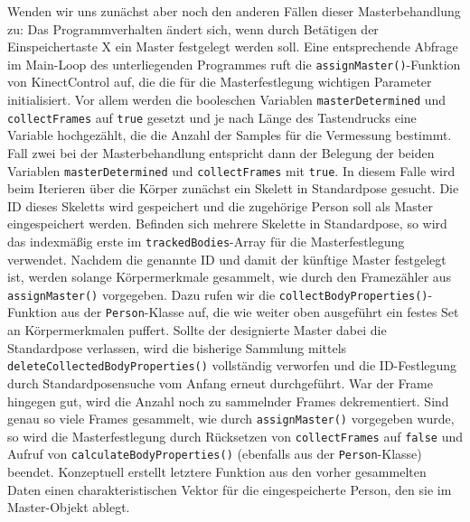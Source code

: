 Wenden wir uns zunächst aber noch den anderen Fällen dieser Masterbehandlung zu: Das Programmverhalten ändert sich, wenn durch Betätigen der Einspeichertaste X ein Master festgelegt werden soll. Eine entsprechende Abfrage im Main-Loop des unterliegenden Programmes ruft die \texttt{assignMaster()}-Funktion von KinectControl auf, die die für die Masterfestlegung wichtigen Parameter initialisiert. Vor allem werden die booleschen Variablen \texttt{masterDetermined} und \texttt{collectFrames} auf \texttt{true} gesetzt und je nach Länge des Tastendrucks eine Variable hochgezählt, die die Anzahl der Samples für die Vermessung bestimmt. Fall zwei bei der Masterbehandlung entspricht dann der Belegung der beiden Variablen \texttt{masterDetermined} und \texttt{collectFrames} mit \texttt{true}. In diesem Falle wird beim Iterieren über die Körper zunächst ein Skelett in Standardpose gesucht. Die ID dieses Skeletts wird gespeichert und die zugehörige Person soll als Master eingespeichert werden. Befinden sich mehrere Skelette in Standardpose, so wird das indexmäßig erste im \texttt{trackedBodies}-Array für die Masterfestlegung verwendet. Nachdem die genannte ID und damit der künftige Master festgelegt ist, werden solange Körpermerkmale gesammelt, wie durch den Framezähler aus \texttt{assignMaster()} vorgegeben. Dazu rufen wir die \texttt{collectBodyProperties()}-Funktion aus der \texttt{Person}-Klasse auf, die wie weiter oben ausgeführt ein festes Set an Körpermerkmalen puffert. Sollte der designierte Master dabei die Standardpose verlassen, wird die bisherige Sammlung mittels \texttt{deleteCollectedBodyProperties()} vollständig verworfen und die ID-Festlegung durch Standardposensuche vom Anfang erneut durchgeführt. War der Frame hingegen gut, wird die Anzahl noch zu sammelnder Frames dekrementiert. Sind genau so viele Frames gesammelt, wie durch \texttt{assignMaster()} vorgegeben wurde, so wird die Masterfestlegung durch Rücksetzen von \texttt{collectFrames} auf \texttt{false} und Aufruf von \texttt{calculateBodyProperties()} (ebenfalls aus der \texttt{Person}-Klasse) beendet. Konzeptuell erstellt letztere Funktion aus den vorher gesammelten Daten einen charakteristischen Vektor für die eingespeicherte Person, den sie im Master-Objekt ablegt.\par 
